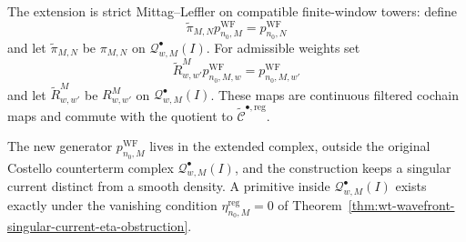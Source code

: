 \begin{thm}
  The extension is strict Mittag--Leffler on compatible finite-window
  towers: define
  \[
    \widetilde\pi_{M,N}p^{\mathrm{WF}}_{n_0,M}
      =
    p^{\mathrm{WF}}_{n_0,N}
  \]
  and let \(\widetilde\pi_{M,N}\) be \(\pi_{M,N}\) on
  \(\mathcal Q^\bullet_{w,M}(I)\).  For admissible weights set
  \[
    \widetilde R^M_{w,w'}p^{\mathrm{WF}}_{n_0,M,w}
      =
    p^{\mathrm{WF}}_{n_0,M,w'}
  \]
  and let \(\widetilde R^M_{w,w'}\) be \(R^M_{w,w'}\) on
  \(\mathcal Q^\bullet_{w,M}(I)\).  These maps are continuous filtered
  cochain maps and commute with the quotient to
  \(\widetilde{\mathcal C}^{\bullet,\mathrm{reg}}\).

  The new generator \(p^{\mathrm{WF}}_{n_0,M}\) lives in the extended
  complex, outside the original Costello counterterm
  complex \(\mathcal Q^\bullet_{w,M}(I)\), and the construction keeps a
  singular current distinct from a smooth density.  A primitive
  inside \(\mathcal Q^\bullet_{w,M}(I)\) exists exactly under the
  vanishing condition \(\eta^{\mathrm{reg}}_{n_0,M}=0\) of
  Theorem~\ref{thm:wt-wavefront-singular-current-eta-obstruction}.
\end{thm}

